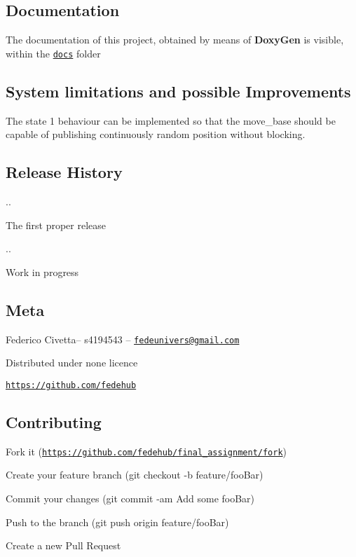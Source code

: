 \subsection*{Documentation}

The documentation of this project, obtained by means of {\bfseries Doxy\+Gen} is visible, within the \href{https://github.com/fedehub/final_assignment/tree/main/docs}{\tt docs} folder

\subsection*{System limitation\textquotesingle{}s and possible Improvements}

The {\ttfamily state 1} behaviour can be implemented so that the move\+\_\+base should be capable of publishing continuously random position without blocking.

\subsection*{Release History}


\begin{DoxyItemize}
\item {..}
\begin{DoxyItemize}
\item The first proper release
\end{DoxyItemize}
\item {..}
\begin{DoxyItemize}
\item Work in progress
\end{DoxyItemize}
\end{DoxyItemize}

\subsection*{Meta}

Federico Civetta– s4194543 – \href{mailto:fedeunivers@gmail.com}{\tt fedeunivers@gmail.\+com}

Distributed under none licence

\href{https://github.com/fedehub}{\tt https\+://github.\+com/fedehub}

\subsection*{Contributing}


\begin{DoxyEnumerate}
\item Fork it (\href{https://github.com/fedehub/final_assignment/fork}{\tt https\+://github.\+com/fedehub/final\+\_\+assignment/fork})
\item Create your feature branch ({\ttfamily git checkout -\/b feature/foo\+Bar})
\item Commit your changes ({\ttfamily git commit -\/am \textquotesingle{}Add some foo\+Bar\textquotesingle{}})
\item Push to the branch ({\ttfamily git push origin feature/foo\+Bar})
\item Create a new Pull Request 
\end{DoxyEnumerate}